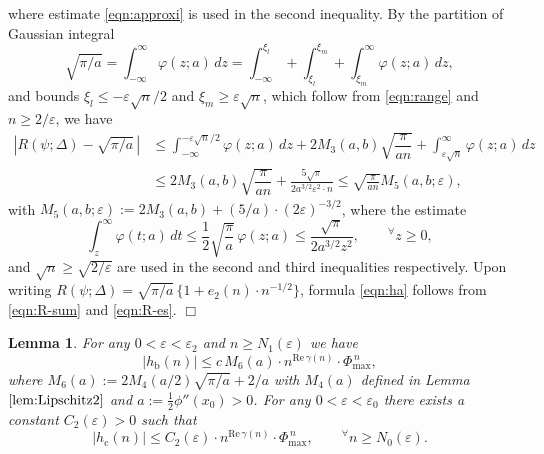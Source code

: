 \documentclass[a4paper,12pt]{article}
\theoremstyle{plain}
\newtheorem{lemma}[theorem]{Lemma}
\def\rb{\mathrm{b}}
\def\rc{\mathrm{c}}
\def\rRe{\mathrm{Re}}
\def\ve{\varepsilon}
\def\vD{\varDelta}
\def\Phim{\Phi_{\scriptstyle \mathrm{max}}}
\begin{document}
where estimate \eqref{eqn:approxi} is used in the second inequality. 
By the partition of Gaussian integral 
\[
\sqrt{\pi/a} = \int_{-\infty}^{\infty} \varphi(z; a) \, 
d z = \int_{-\infty}^{\xi_l} + \int_{\xi_l}^{\xi_m} + 
\int_{\xi_m}^{\infty} \varphi(z; a) \, d z,  
\]  
and bounds $\xi_l \le -\ve \sqrt{n}/2$ and $\xi_m \ge \ve \sqrt{n}$, 
which follow from \eqref{eqn:range} and $n \ge 2/\ve$, we have  
\begin{align}
\left| R(\psi; \vD) - \sqrt{\pi/a} \, \right| 
& \le \int_{-\infty}^{-\ve \sqrt{n}/2} \varphi(z; a) \, d z + 
2 M_3(a, b) \sqrt{\dfrac{\pi}{a n}} + 
\int_{\ve \sqrt{n}}^{\infty} \varphi(z; a) \, d z \nonumber \\
& \le 2 M_3(a, b) \sqrt{\dfrac{\pi}{a n}} + 
\frac{5 \sqrt{\pi}}{2 a^{3/2} \ve^2 \cdot n} \le 
\sqrt{\frac{\pi}{a n}} M_5(a, b; \ve),  \label{eqn:R-es}
\end{align}
with $M_5(a, b; \ve) := 2 M_3(a, b) + (5/a) \cdot (2 \ve)^{-3/2}$, 
where the estimate  
\[
\int_z^{\infty} \varphi(t; a) \, d t \le 
\frac{1}{2} \sqrt{\frac{\pi}{a}} \, \varphi(z; a) 
\le \frac{\sqrt{\pi}}{2 a^{3/2} z^2},  \qquad 
{}^{\forall} z \ge 0,   
\]
and $\sqrt{n} \ge \sqrt{2/\ve}$ are used in the second and third 
inequalities respectively. 
Upon writing $R(\psi; \vD) = \sqrt{\pi/a} \, \{ 1 + e_2(n) \cdot n^{-1/2} \}$, 
formula \eqref{eqn:ha} follows from \eqref{eqn:R-sum} and 
\eqref{eqn:R-es}. \hfill $\Box$  
\begin{lemma} \label{lem:hbc}  
For any $0 < \ve < \ve_2$ and $n \ge N_1(\ve)$ we have    
\begin{equation} \label{eqn:hb} 
|h_{\rb}(n) | \le c \, M_6(a) \cdot n^{\rRe \, \gamma(n)} \cdot \Phim^{\, n}, 
\end{equation}
where $M_6(a) := 2 M_4(a/2) \sqrt{\pi/a} + 2/a$ with $M_4(a)$ defined in Lemma 
$\ref{lem:Lipschitz2}$ and $a := \frac{1}{2} \phi''(x_0) > 0$. 
For any $0 < \ve < \ve_0$ there exists a constant $C_2(\ve) > 0$ such that  
\begin{equation} \label{eqn:hc}
| h_{\rc}(n) | \le C_2(\ve) \cdot n^{\rRe \, \gamma(n)} \cdot \Phim^{\, n}, 
\qquad {}^{\forall} n \ge N_0(\ve).   
\end{equation}
\end{lemma}
\end{document}
